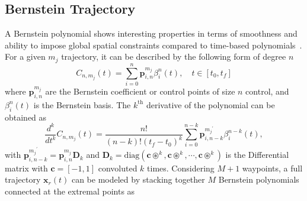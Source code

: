 



\subsection{Bernstein Trajectory}
\label{sec:planner}

A Bernstein polynomial shows interesting properties in terms of smoothness and ability to impose global spatial constraints compared to time-based polynomials~\cite{kielas2019bebot,kielas2022bernstein}. For a given $m_j$  trajectory, it can be described by the following form of degree $n$
\begin{equation}
C_{n,m_j}(t) = \sum_{i=0}^{n}\mathbf{p}_{i,n}^{m_j}\beta^n_i(t),   \quad t\in [t_0, t_f]
\label{eq:bernstein_equation}
\end{equation}
where $\mathbf{p}_{i,n}^{m_j}$ are the Bernstein coefficient or control points of  size $n$ control, and $\beta^n_i(t)$ is the Bernstein basis. The $k^{\text{th}}$ derivative of the polynomial can be obtained as
\begin{equation}
\frac{d^{k}}{dt^{k}}C_{n,m_j}(t) = \frac{n!}{(n-k)!(t_f - t_0)^k} \sum_{i=0}^{n-k} {{\mathbf{p}}^{{m_j}^{'}}_{i,n-k}}\beta_{i}^{n-k}(t),
\label{eq:bernstein_derivative}
\end{equation}
with ${\mathbf{p}}^{{m_j}^{'}}_{i,n-k} = \mathbf{p}_{i,n}^{m_j}\mathbf{D}_k$ and $\mathbf{D}_k = \text{diag}(\mathbf{c}\circledast^k, \mathbf{c}\circledast^k, \cdots, \mathbf{c}\circledast^k)$ is the Differential matrix with $ \mathbf{c} = [-1, 1]$ convoluted $k$ times. Considering $M+1$ waypoints, a full trajectory $\mathbf{x}_{r}(t)$ can be modeled by stacking together $M$ Bernstein polynomials connected at the extremal points as


